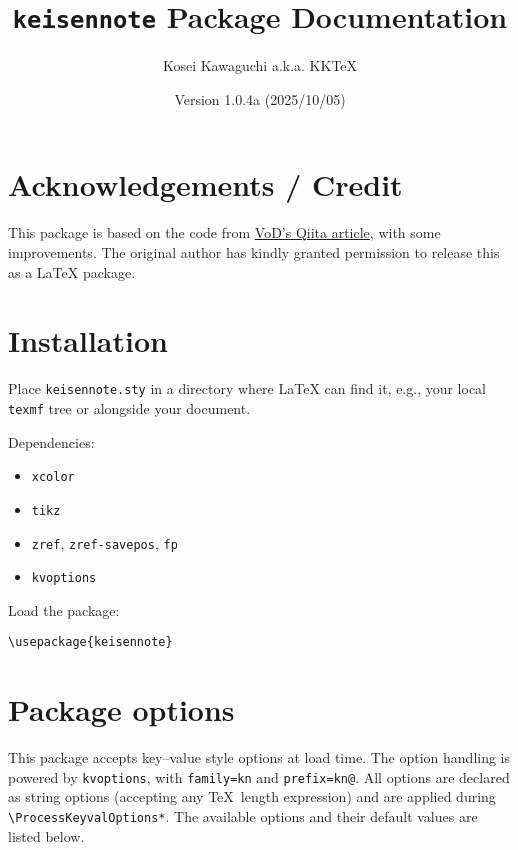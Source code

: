 \documentclass[a4paper,12pt]{article}
\title{\texttt{keisennote} Package Documentation}
\author{Kosei Kawaguchi a.k.a. KKTeX}
\date{Version 1.0.4a (2025/10/05)}
\begin{document}
\begin{titlepage}
  \maketitle
\end{titlepage}
\newpage
\tableofcontents
\newpage

\section{Acknowledgements / Credit}

This package is based on the code from 
\href{https://qiita.com/VoD/items/6849e63b978050218d2f}{VoD's Qiita article}, 
with some improvements. The original author has kindly granted permission 
to release this as a LaTeX package.

\section{Installation}

Place \texttt{keisennote.sty} in a directory where LaTeX can find it, e.g., your local \texttt{texmf} tree or alongside your document.

Dependencies:
\begin{itemize}
    \item \texttt{xcolor} 
    \item \texttt{tikz}
    \item \texttt{zref}, \texttt{zref-savepos}, \texttt{fp}
    \item \texttt{kvoptions}
\end{itemize}


Load the package:

\begin{verbatim}
\usepackage{keisennote}
\end{verbatim}

\section{Package options}

This package accepts key--value style options at load time.  
The option handling is powered by \texttt{kvoptions}, with
\texttt{family=kn} and \texttt{prefix=kn@}.  
All options are declared as string options (accepting any \TeX\ length expression)
and are applied during \verb|\ProcessKeyvalOptions*|.  
The available options and their default values are listed below.
\end{document}
